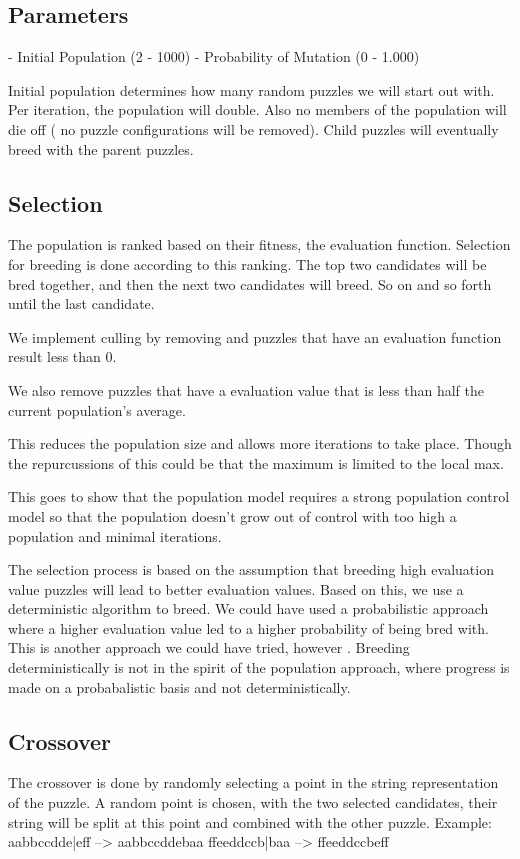 \documentclass{report}
\begin{document}
\subsection{Parameters}
	- Initial Population (2 - 1000)
	- Probability of Mutation (0 - 1.000)

Initial population determines how many random puzzles we will start out with. Per iteration, the population will double. Also no members of the population will die off ( no puzzle configurations will be removed). Child puzzles will eventually breed with the parent puzzles.


\subsection{Selection}
The population is ranked based on their fitness, the evaluation function. Selection for breeding is done according to this ranking. The top two candidates will be bred together, and then the next two candidates will breed. So on and so forth until the last candidate.

We implement culling by removing and puzzles that have an evaluation function result less than 0. 

We also remove puzzles that have a evaluation value that is less than half the current population's average.

This reduces the population size and allows more iterations to take place. Though the repurcussions of this could be that the maximum is limited to the local max.

This goes to show that the population model requires a strong population control model so that the population doesn't grow out of control with too high a population and minimal iterations.

The selection process is based on the assumption that breeding high evaluation value puzzles will lead to better evaluation values. Based on this, we use a deterministic algorithm to breed. We could have used a probabilistic approach where a higher evaluation value led to a higher probability of being bred with. This is another approach we could have tried, however . Breeding deterministically is not in the spirit of the population approach, where progress is made on a probabalistic basis and not deterministically.


\subsection{Crossover}
The crossover is done by randomly selecting a point in the string representation of the puzzle. A random point is chosen, with the two selected candidates, their string will be split at this point and combined with the other puzzle. 
Example: 
aabbccdde|eff --> aabbccddebaa
ffeeddccb|baa --> ffeeddccbeff
\end{document}
